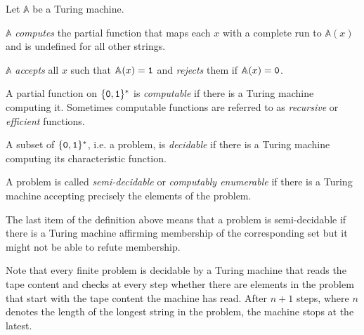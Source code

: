 \begin{defin}
    Let $\mathbb A$ be a Turing machine.

    \begin{thmlist}
        \item
          $\mathbb A$ \emph{computes} the partial function that maps each
          $x$ with a complete run to $\mathbb A(x)$ and is undefined for all
          other strings.
        \item
          $\mathbb A$ \emph{accepts} all $x$ such that
          $\mathbb A(x) = \mathtt 1$ and \emph{rejects} them if
          $\mathbb A(x) = \mathtt 0$.
        \item
          A partial function on $\lbrace \mathtt 0, \mathtt 1 \rbrace^*$ is
          \emph{computable} if there is a Turing machine computing it. Sometimes
          computable functions are referred to as \emph{recursive} or
          \emph{efficient} functions.
        \item
          A subset of $\lbrace \mathtt 0, \mathtt 1 \rbrace^*$, i.e. a
          problem, is \emph{decidable} if there is a Turing machine computing
          its characteristic function.
        \item
          A problem is called \emph{semi-decidable} or \emph{computably
          enumerable} if there is a Turing machine accepting precisely the
          elements of the problem.
    \end{thmlist}
\end{defin}

The last item of the definition above means that a problem is
semi-decidable if there is a Turing machine affirming membership of the
corresponding set but it might not be able to refute membership.

Note that every finite problem is decidable by a Turing machine that reads the
tape content and checks at every step whether there are elements in the problem
that start with the tape content the machine has read. After $n + 1$ steps,
where $n$ denotes the length of the longest string in the problem, the machine
stops at the latest.

